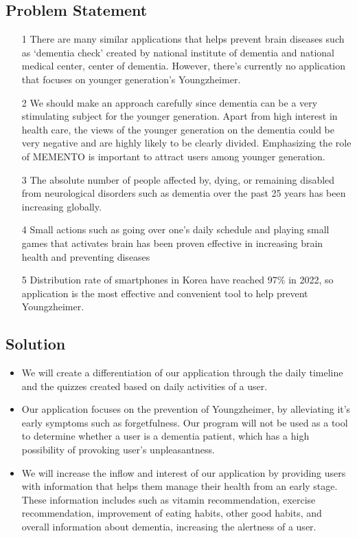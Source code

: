 \documentclass[conference]{IEEEtran}
\begin{document}
\subsection{Problem Statement}\label{SCM}
\begin{itemize}
\item [1] There are many similar applications that helps prevent brain diseases such as ‘dementia check’ created by national institute of dementia and national medical center, center of dementia. However, there’s currently no application that focuses on younger generation’s Youngzheimer.\\
\item [2] We should make an approach carefully since dementia can be a very stimulating subject for the younger generation. Apart from high interest in health care, the views of the younger generation on the  dementia could be very negative and are highly likely to be clearly divided. Emphasizing the role of MEMENTO is important to attract users among younger generation.\\
\item [3] The absolute number of people affected by, dying, or remaining disabled from neurological disorders such as dementia over the past 25 years has been increasing globally.\\
\item [4] Small actions such as going over one’s daily schedule and playing small games that activates brain has been proven effective in increasing brain health and preventing diseases\\
\item [5] Distribution rate of smartphones in Korea have reached 97\% in 2022, so application is the most effective and convenient tool to help prevent Youngzheimer.\\
\end{itemize}

\subsection{Solution}\label{SCM}
\begin{itemize}
\item We will create a differentiation of our application through the daily timeline and the quizzes created based on daily activities of a user.\\
\item Our application focuses on the prevention of Youngzheimer, by alleviating it’s early symptoms such as forgetfulness. Our program will not be used as a tool to determine whether a user is a dementia patient, which has a high possibility of provoking user’s unpleasantness.\\
\item We will increase the inflow and interest of our application by providing users with information that helps them manage their health from an early stage. These information includes such as vitamin recommendation, exercise recommendation, improvement of eating habits, other good habits, and overall information about dementia, increasing the alertness of a user.\\
\end{itemize}
\end{document}
